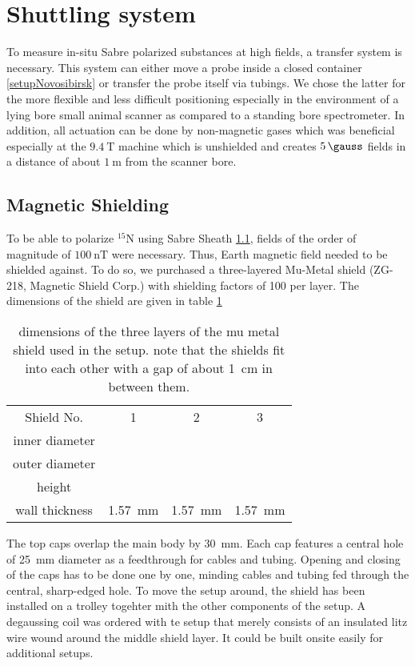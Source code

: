     \section{Shuttling system}\label{sec:shuttlingSystem}
        To measure in-situ Sabre polarized substances at high fields, a transfer system is
        necessary. This system can either move a probe inside a closed container
        \ref{setupNovosibirsk} or transfer the probe itself via tubings. We chose the latter for the
        more flexible and less difficult positioning especially in the environment of a lying bore
        small animal scanner as compared to a standing bore spectrometer. In addition, all actuation
        can be done by non-magnetic gases which was beneficial especially at the $\SI{9.4}{\tesla}$
        machine which is unshielded and creates $\SI{5}{\gauss}$ fields in a distance of about $\SI{1}{\meter}$ from
        the scanner bore.
        \subsection{Magnetic Shielding}
        To be able to polarize $^{15}\mathrm{N}$ using Sabre Sheath \ref{}, fields of the order of
            magnitude of $\SI{100}{\nano\tesla}$ were necessary. Thus, Earth magnetic field needed to
            be shielded against. To do so, we purchased a three-layered Mu-Metal shield (ZG-218, Magnetic
            Shield Corp.) with shielding factors of 100 per layer. The dimensions of the shield are given in table \ref{table:matMeth:muMetalDims}
            \begin{table}
                \centering
                \begin{tabular}{cccc}
                    Shield No. & 1 & 2 & 3 \\
                    inner diameter & & & \\
                    outer diameter & & & \\
                    height & & &\\
                    wall thickness &\SI{1.57}{\mm}&\SI{1.57}{\mm}&\SI{1.57}{\mm} 
                \end{tabular}
                \caption[shield dimensions]{dimensions of the three layers of the mu metal shield used in the setup. note that the shields  fit into each other with a gap of about \SI{1}{\cm} in between them.}
                \label{table:matMeth:muMetalDims}
            \end{table}
            The top caps overlap the main body by \SI{30}{\mm}.  Each cap features a central hole of \SI{25}{\mm} diameter as a feedthrough for cables and tubing. Opening and closing of the caps has to be done one by one, minding cables and tubing fed through the central, sharp-edged hole. To move the setup around, the shield has been installed on a trolley togehter mith the other components of the setup.  A degaussing coil was ordered with te setup that merely consists of an insulated litz wire wound around the middle shield layer.  It could be built onsite easily for additional setups.
